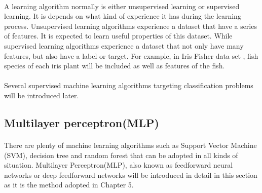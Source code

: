 \paragraph{}
A learning algorithm normally is either unsupervised learning or supervised learning.
It is depends on what kind of experience it has during the learning process.
Unsupervised learning algorithms experience a dataset that have a series of features.
It is expected to learn useful properties of this dataset.
While supervised learning algorithms experience a dataset that not only have many features, but also have a label or target.
For example, in Iris Fisher data set \cite{Fisher1936}, fish species of each iris plant will be included as well as features of the fish. 

\paragraph{}
Several supervised machine learning algorithms targeting classification problems will be introduced later.

\subsection{Multilayer perceptron(MLP)}
\paragraph{}
There are plenty of machine learning algorithms such as Support Vector Machine (SVM)\cite{Boser1996,Cortes1995}, decision tree\cite{Olshen1984} and random forest\cite{Ho1995} that can be adopted in all kinds of situation.
Multilayer Perceptron(MLP), also known as feedforward neural networks or deep feedforward networks will be introduced in detail in this section as it is the method adopted in Chapter 5.

